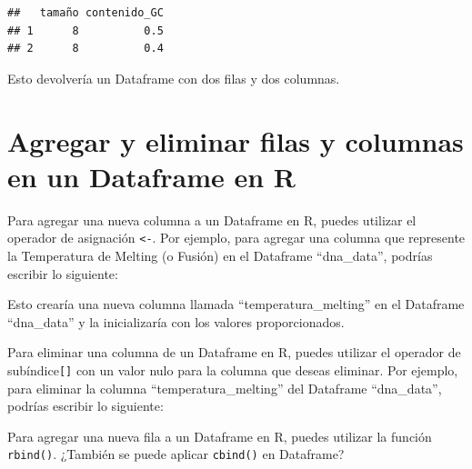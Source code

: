 \documentclass[
]{book}
\newenvironment{Shaded}{\begin{snugshade}}{\end{snugshade}}
\newcommand{\ConstantTok}[1]{\textcolor[rgb]{0.56,0.35,0.01}{#1}}
\newcommand{\DecValTok}[1]{\textcolor[rgb]{0.00,0.00,0.81}{#1}}
\newcommand{\FunctionTok}[1]{\textcolor[rgb]{0.13,0.29,0.53}{\textbf{#1}}}
\newcommand{\NormalTok}[1]{#1}
\newcommand{\OtherTok}[1]{\textcolor[rgb]{0.56,0.35,0.01}{#1}}
\newcommand{\SpecialCharTok}[1]{\textcolor[rgb]{0.81,0.36,0.00}{\textbf{#1}}}
\begin{document}
\begin{verbatim}
##   tamaño contenido_GC
## 1      8          0.5
## 2      8          0.4
\end{verbatim}

Esto devolvería un Dataframe con dos filas y dos columnas.

\hypertarget{agregar-y-eliminar-filas-y-columnas-en-un-dataframe-en-r}{%
\section{Agregar y eliminar filas y columnas en un Dataframe en R}\label{agregar-y-eliminar-filas-y-columnas-en-un-dataframe-en-r}}

Para agregar una nueva columna a un Dataframe en R, puedes utilizar el operador de asignación \texttt{\textless{}-}.
Por ejemplo, para agregar una columna que represente la Temperatura de Melting (o Fusión) en el Dataframe ``dna\_data'', podrías escribir lo siguiente:

\begin{Shaded}
\end{Shaded}

Esto crearía una nueva columna llamada ``temperatura\_melting'' en el Dataframe ``dna\_data'' y la inicializaría con los valores proporcionados.

Para eliminar una columna de un Dataframe en R, puedes utilizar el operador de subíndice\texttt{{[}{]}} con un valor nulo para la columna que deseas eliminar. Por ejemplo, para eliminar la columna ``temperatura\_melting'' del Dataframe ``dna\_data'', podrías escribir lo siguiente:

\begin{Shaded}
\end{Shaded}

Para agregar una nueva fila a un Dataframe en R, puedes utilizar la función \texttt{rbind()}. ¿También se puede aplicar \texttt{cbind()} en Dataframe?
\end{document}
